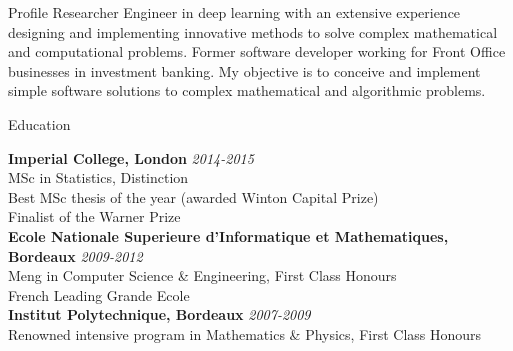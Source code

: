 \documentclass{resume} %
\begin{document}
\begin{rSection}{Profile}
Researcher Engineer in deep learning with an extensive experience designing and
implementing innovative methods to solve complex mathematical and computational problems.
Former software developer working for Front Office businesses in investment banking.
My objective is to conceive and implement simple software solutions to complex mathematical and algorithmic problems.

\end{rSection}


\begin{rSection}{Education}

{\bf Imperial College, London} \hfill {\em 2014-2015} \\ 
MSc in Statistics, Distinction \\
Best MSc thesis of the year (awarded Winton Capital Prize) \\
Finalist of the Warner Prize \\

{\bf Ecole Nationale Superieure d'Informatique et Mathematiques, Bordeaux} \hfill {\em 2009-2012} \\ 
Meng in Computer Science \& Engineering, First Class Honours \\
French Leading Grande Ecole \\

{\bf Institut Polytechnique, Bordeaux} \hfill {\em 2007-2009} \\ 
Renowned intensive program in Mathematics \& Physics, First Class Honours \\


\end{rSection}

\end{document}
